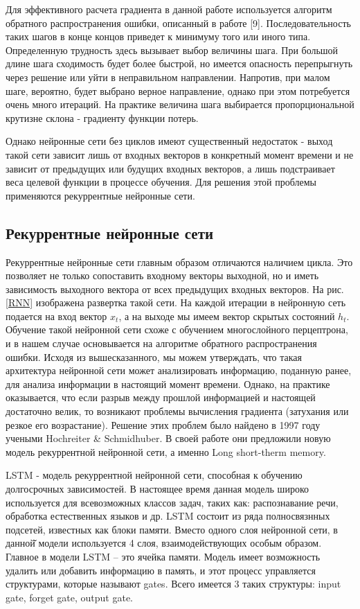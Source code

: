     Для эффективного расчета градиента в данной работе используется алгоритм обратного распространения ошибки, описанный в работе [9]. Последовательность таких шагов в конце концов приведет к минимуму того или иного типа. Определенную трудность здесь вызывает выбор величины шага. При большой длине шага сходимость будет более быстрой, но имеется опасность пе­репрыгнуть через решение или уйти в неправильном направлении. Напротив, при малом шаге, вероятно, будет выбрано верное на­правление, однако при этом потребуется очень много итераций. На практике величина шага выбирается пропорциональной крутизне склона - градиенту функции потерь.

    Однако нейронные сети без циклов имеют существенный недостаток - выход такой сети зависит лишь от входных векторов в конкретный момент времени и не зависит от предыдущих или будущих входных векторов, а лишь подстраивает веса целевой функции в процессе обучения. Для решения этой проблемы применяются рекуррентные нейронные сети.

    \subsection{Рекуррентные нейронные сети}
    Рекуррентные нейронные сети главным образом отличаются наличием цикла. Это позволяет не только сопоставить входному векторы выходной, но и иметь зависимость выходного вектора от всех предыдущих входных векторов. На рис. \ref{RNN} изображена развертка такой сети. На каждой итерации в нейронную сеть подается на вход вектор $x_{t}$, а на выходе мы имеем вектор скрытых состояний $h_{t}$.
    Обучение такой нейронной сети схоже с обучением многослойного перцептрона, и в нашем случае основывается на алгоритме обратного распространения ошибки. Исходя из вышесказанного, мы можем утверждать, что такая архитектура нейронной сети может анализировать информацию, поданную ранее, для анализа информации в настоящий момент времени. Однако, на практике оказывается, что если разрыв между прошлой информацией и настоящей достаточно велик, то возникают проблемы вычисления градиента (затухания или резкое его возрастание). Решение этих проблем было найдено в 1997 году учеными Hochreiter \& Schmidhuber. В своей работе они предложили новую модель рекуррентной нейронной сети, а именно Long short-therm memory.

    LSTM - модель рекуррентной нейронной сети, способная к обучению долгосрочных зависимостей. В настоящее время данная модель широко используется для всевозможных классов задач, таких как: распознавание речи, обработка естественных языков и др. LSTM состоит из ряда полносвязнных подсетей, известных как блоки памяти. Вместо одного слоя нейронной сети, в данной̆ модели используется 4 слоя, взаимодействующих особым образом. Главное в модели LSTM – это ячейка памяти. Модель имеет возможность удалить или добавить информацию в память, и этот процесс управляется структурами, которые называют gates. Всего имеется 3 таких структуры: input gate, forget gate, output gate.
    
